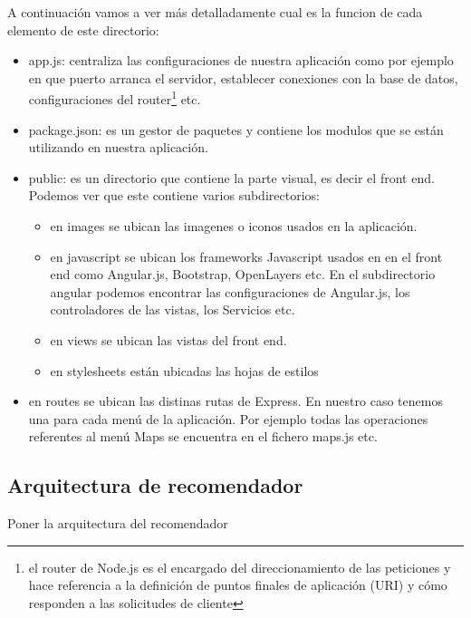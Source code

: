 A continuación vamos a ver más detalladamente cual es la funcion de cada elemento de este directorio:
\begin{itemize}
	\item app.js: centraliza las configuraciones de nuestra aplicación como por ejemplo en que puerto arranca el servidor, establecer conexiones con la base de datos, configuraciones del router\footnote{el router de Node.js es el encargado del direccionamiento de las peticiones y hace referencia a la definición de puntos finales de aplicación (URI) y cómo responden a las solicitudes de cliente} etc.
	\item package.json: es un gestor de paquetes y contiene los modulos que se están utilizando en nuestra aplicación.
	\item public: es un directorio que contiene la parte visual, es decir el front end. Podemos ver que este contiene varios subdirectorios:
	\begin{itemize}
	\item en images se ubican las imagenes o iconos usados en la aplicación.
	\item en javascript se ubican los frameworks Javascript usados en en el front end como Angular.js, Bootstrap, OpenLayers etc. En el subdirectorio angular podemos encontrar las configuraciones de Angular.js, los controladores de las vistas, los Servicios etc.
	\item en views se ubican las vistas del front end.
	\item en stylesheets están ubicadas las hojas de estilos
	\end{itemize}
	\item en routes se ubican las distinas rutas de Express. En nuestro caso tenemos una para cada menú de la aplicación. Por ejemplo todas las operaciones referentes al menú Maps se encuentra en el fichero maps.js etc.
\end{itemize}

\subsection{Arquitectura de recomendador}
\thispagestyle{empty}

Poner la arquitectura del recomendador
